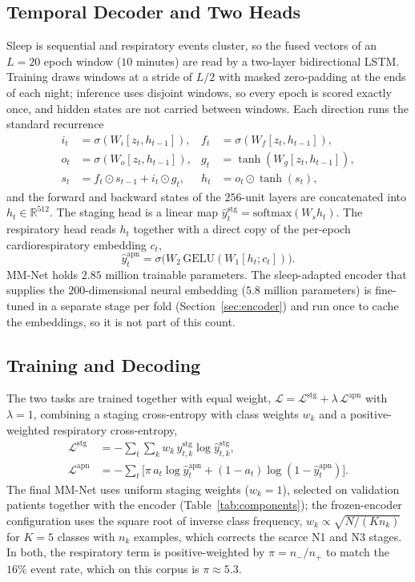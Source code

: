 \documentclass[a4paper,fleqn]{cas-sc}
\begin{document}
\subsection{Temporal Decoder and Two Heads}
Sleep is sequential and respiratory events cluster, so the fused vectors of an $L=20$ epoch
window ($10$ minutes) are read by a two-layer bidirectional LSTM. Training draws windows at a
stride of $L/2$ with masked zero-padding at the ends of each night; inference uses disjoint
windows, so every epoch is scored exactly once, and hidden states are not carried between
windows. Each direction runs the standard recurrence
\begin{align}
i_t&=\sigma(W_i[z_t,h_{t-1}]), & f_t&=\sigma(W_f[z_t,h_{t-1}]),\nonumber\\
o_t&=\sigma(W_o[z_t,h_{t-1}]), & g_t&=\tanh(W_g[z_t,h_{t-1}]),\\
s_t&=f_t\odot s_{t-1}+i_t\odot g_t, & h_t&=o_t\odot\tanh(s_t),\nonumber
\end{align}
and the forward and backward states of the $256$-unit layers are concatenated into
$h_t\in\mathbb{R}^{512}$. The
staging head is a linear map $\hat y^{\mathrm{stg}}_t=\mathrm{softmax}(W_s h_t)$. The
respiratory head reads $h_t$ together with a direct copy of the per-epoch cardiorespiratory
embedding $c_t$,
\begin{equation}
\hat y^{\mathrm{apn}}_t=\sigma\!\big(W_2\,\mathrm{GELU}(W_1[h_t;c_t])\big).
\end{equation}
MM-Net holds $2.85$ million trainable parameters. The sleep-adapted encoder that supplies
the $200$-dimensional neural embedding ($5.8$ million parameters) is fine-tuned in a separate
stage per fold (Section~\ref{sec:encoder}) and run once to cache the embeddings, so it is not
part of this count.

\subsection{Training and Decoding}
\label{sec:training}
The two tasks are trained together with equal weight, $\mathcal{L}=\mathcal{L}^{\mathrm{stg}}+\lambda\,\mathcal{L}^{\mathrm{apn}}$ with $\lambda=1$, combining a staging cross-entropy with class weights $w_k$ and a positive-weighted respiratory cross-entropy,
\begin{align}
\mathcal{L}^{\mathrm{stg}}&=-\sum_t\sum_{k}w_k\,y^{\mathrm{stg}}_{t,k}\log\hat y^{\mathrm{stg}}_{t,k},\\
\mathcal{L}^{\mathrm{apn}}&=-\sum_t\big[\pi\,a_t\log\hat y^{\mathrm{apn}}_t+(1-a_t)\log(1-\hat y^{\mathrm{apn}}_t)\big].
\end{align}
The final MM-Net uses uniform staging weights ($w_k=1$), selected on validation patients
together with the encoder (Table~\ref{tab:components}); the frozen-encoder configuration uses the
square root of inverse class frequency,
$w_k\propto\sqrt{N/(K n_k)}$ for $K=5$ classes with $n_k$ examples, which corrects the scarce
N1 and N3 stages. In both, the respiratory term is
positive-weighted by $\pi=n_-/n_+$ to match the $16\%$ event rate, which on this corpus is
$\pi\approx5.3$.
\end{document}

